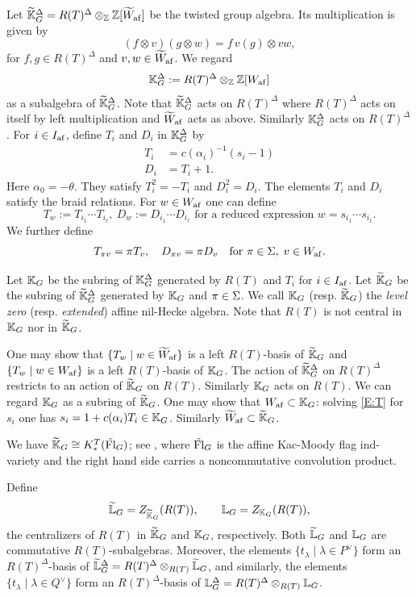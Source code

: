 \documentclass[a4paper]{amsart}
\theoremstyle{remark}
\numberwithin{equation}{section}
\begin{document}
Let $\widetilde{\mathbb{K}}_G^\Delta = R(T)^\Delta \otimes_{\mathbb{Z}} \mathbb{Z}[\widetilde{W}_{\mathrm{af}}]$ be the twisted group algebra. Its multiplication is given by
\[
(f \otimes v)(g \otimes w) = f \, v(g) \otimes vw,
\]
for $f,g \in R(T)^\Delta$ and $v,w \in \widetilde{W}_{\mathrm{af}}$. We regard
\[
 \mathbb{K}_G^\Delta:= R(T)^\Delta \otimes_{\mathbb{Z}} \mathbb{Z}[W_{\mathrm{af}}]
\]
as a subalgebra of $\widetilde{\mathbb{K}}_G^\Delta$. Note that $\widetilde{\mathbb{K}}_G^\Delta$ acts on $R(T)^\Delta$ where $R(T)^\Delta$ acts on itself by left multiplication and $\widetilde{W}_{\mathrm{af}}$ acts as above. Similarly $\mathbb{K}_G^\Delta$ acts on $R(T)^\Delta$. For $i \in I_{\mathrm{af}}$, define $T_i$ and $D_i$ in $\mathbb{K}_G^\Delta$ by
\begin{align}\label{E:T}
T_i &= c(\alpha_i)^{-1}(s_i-1) \\
\label{E:D}
D_i &= T_i+1 .
\end{align}
Here $\alpha_0 = -\theta$.
They satisfy $T_i^2 = -T_i$ and $D_i^2=D_i$. The elements $T_i$ and $D_i$ satisfy the braid relations. For $w \in W_{\mathrm{af}}$ one can define
\[
T_w:= T_{i_1} \cdots T_{i_\ell},~ D_w:= D_{i_1} \cdots D_{i_\ell} \text{ for a reduced expression $w = s_{i_1} \cdots s_{i_\ell}$.}
\]
We further define
\begin{equation}\label{eq:A-pi-v}
T_{\pi v} = \pi T_v, \quad D_{\pi v}=\pi D_v \quad \text{for } \pi \in \Sigma, \; v \in W_{\mathrm{af}}.
\end{equation}

Let $\mathbb{K}_G$ be the subring of $\mathbb{K}_G^\Delta$ generated by $R(T)$ and $T_i$ for $i\in I_{\mathrm{af}}$. Let $\widetilde{\mathbb{K}}_G$ be the subring of $\widetilde{\mathbb{K}}_G^\Delta$ generated by $\mathbb{K}_G$ and $\pi\in \Sigma$. 
We call $\mathbb{K}_G$ (resp. $\widetilde{\mathbb{K}}_G$) the \emph{level zero} (resp. \emph{extended}) affine nil-Hecke algebra. 
Note that $R(T)$ is not central in $\mathbb{K}_G$ nor in $\widetilde{\mathbb{K}}_G$.

One may show that 
$\{T_w \mid w\in \widetilde{W}_{\mathrm{af}}\}$ is a left $R(T)$-basis of $\widetilde{\mathbb{K}}_G$ and $\{T_w\mid w\in W_{\mathrm{af}}\}$ is a left $R(T)$-basis of $\mathbb{K}_G$. The action of $\widetilde{\mathbb{K}}_G^\Delta$ on $R(T)^\Delta$ restricts to an action of $\widetilde{\mathbb{K}}_G$ on $R(T)$. 
Similarly $\mathbb{K}_G$ acts on $R(T)$. We can regard $\mathbb{K}_G$ as a subring of $\widetilde{\mathbb{K}}_G$. One may show that $W_{\mathrm{af}}\subset \mathbb{K}_G$: solving \eqref{E:T} for $s_i$ one has $s_i = 1+c(\alpha_i) T_i\in \mathbb{K}_G$. Similarly $\widetilde{W}_{\mathrm{af}}\subset \widetilde{\mathbb{K}}_G$.

We have $\widetilde{\mathbb{K}}_G \cong K^T_*(\tilde{\mathrm{Fl}}_G)$; see \cite{KashiwaraNotes}, where
$\tilde{\mathrm{Fl}}_G$ is the affine Kac-Moody flag ind-variety and the right hand side carries a noncommutative convolution product.




Define
$$\widetilde{\mathbb{L}}_G=Z_{\widetilde{\mathbb{K}}_G}(R(T)),\qquad \mathbb{L}_G=Z_{\mathbb{K}_G}(R(T)),$$
the centralizers of $R(T)$ in $\widetilde{\mathbb{K}}_G$ and $\mathbb{K}_G$, respectively.
Both $\widetilde{\mathbb{L}}_G$ and $\mathbb{L}_G$ are commutative $R(T)$-subalgebras.
Moreover, the elements $\{ t_{\lambda }\mid \lambda \in P^{\lor }\}$ form an $R(T)^{\Delta }$-basis of
$\widetilde{\mathbb{L}}_G^{\Delta }=R(T)^{\Delta }\otimes _{R(T)}\widetilde{\mathbb{L}}_G$,
and similarly, the elements  $\{t_{\lambda }\mid \lambda \in Q^{\lor }\}$  form an $R(T)^{\Delta }$-basis of
$\mathbb{L}_G^{\Delta }=R(T)^{\Delta }\otimes _{R(T)}\mathbb{L}_G$.
\end{document}
